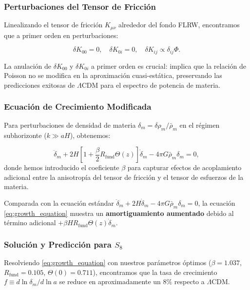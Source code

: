 \documentclass[12pt, a4paper]{article}
\theoremstyle{plain}
\theoremstyle{definition}
\begin{document}
\subsubsection{Perturbaciones del Tensor de Fricción}

Linealizando el tensor de fricción $K_{\mu\nu}$ alrededor del fondo FLRW, encontramos que a primer orden en perturbaciones:

\begin{equation}
\delta K_{00} = 0, \quad \delta K_{0i} = 0, \quad \delta K_{ij} \propto \delta_{ij} \Phi.
\end{equation}

La anulación de $\delta K_{00}$ y $\delta K_{0i}$ a primer orden es crucial: implica que la relación de Poisson no se modifica en la aproximación cuasi-estática, preservando las predicciones exitosas de $\Lambda$CDM para el espectro de potencia de materia.

\subsubsection{Ecuación de Crecimiento Modificada}

Para perturbaciones de densidad de materia $\delta_m = \delta\rho_m/\bar{\rho}_m$ en el régimen subhorizonte ($k \gg aH$), obtenemos:

\begin{equation}
\ddot{\delta}_m + 2H\left[1 + \frac{\beta}{2} R_{\text{fund}} \Theta(z)\right]\dot{\delta}_m - 4\pi G \bar{\rho}_m \delta_m = 0,
\label{eq:growth_equation}
\end{equation}
donde hemos introducido el coeficiente $\beta$ para capturar efectos de acoplamiento adicional entre la anisotropía del tensor de fricción y el tensor de esfuerzos de la materia.

Comparada con la ecuación estándar $\ddot{\delta}_m + 2H\dot{\delta}_m - 4\pi G\bar{\rho}_m\delta_m = 0$, la ecuación \eqref{eq:growth_equation} muestra un \textbf{amortiguamiento aumentado} debido al término adicional $+\beta H R_{\text{fund}} \Theta(z)\dot{\delta}_m$.

\subsubsection{Solución y Predicción para $S_8$}

Resolviendo \eqref{eq:growth_equation} con nuestros parámetros óptimos ($\beta = 1.037$, $R_{\text{fund}} = 0.105$, $\Theta(0) = 0.711$), encontramos que la tasa de crecimiento $f \equiv d\ln\delta_m/d\ln a$ se reduce en aproximadamente un $8\%$ respecto a $\Lambda$CDM.
\end{document}
